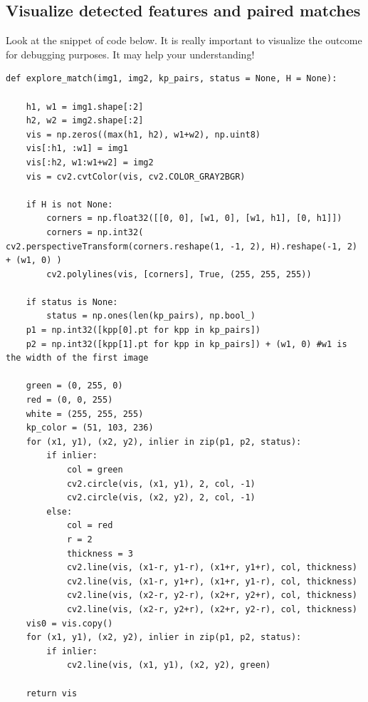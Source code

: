 \documentclass[aps,letterpaper,10pt]{revtex4}
\begin{document}
\subsection{Visualize detected features and paired matches}
Look at the snippet of code below. It is really important to visualize the outcome for debugging purposes. It may help your understanding!
\begin{lstlisting}
def explore_match(img1, img2, kp_pairs, status = None, H = None):

    h1, w1 = img1.shape[:2]
    h2, w2 = img2.shape[:2]
    vis = np.zeros((max(h1, h2), w1+w2), np.uint8)
    vis[:h1, :w1] = img1
    vis[:h2, w1:w1+w2] = img2
    vis = cv2.cvtColor(vis, cv2.COLOR_GRAY2BGR)

    if H is not None:
        corners = np.float32([[0, 0], [w1, 0], [w1, h1], [0, h1]])
        corners = np.int32( cv2.perspectiveTransform(corners.reshape(1, -1, 2), H).reshape(-1, 2) + (w1, 0) )
        cv2.polylines(vis, [corners], True, (255, 255, 255))      

    if status is None:
        status = np.ones(len(kp_pairs), np.bool_)
    p1 = np.int32([kpp[0].pt for kpp in kp_pairs])
    p2 = np.int32([kpp[1].pt for kpp in kp_pairs]) + (w1, 0) #w1 is the width of the first image

    green = (0, 255, 0)
    red = (0, 0, 255)
    white = (255, 255, 255)
    kp_color = (51, 103, 236)
    for (x1, y1), (x2, y2), inlier in zip(p1, p2, status):
        if inlier:
            col = green
            cv2.circle(vis, (x1, y1), 2, col, -1)
            cv2.circle(vis, (x2, y2), 2, col, -1)
        else:
            col = red
            r = 2
            thickness = 3
            cv2.line(vis, (x1-r, y1-r), (x1+r, y1+r), col, thickness)
            cv2.line(vis, (x1-r, y1+r), (x1+r, y1-r), col, thickness)
            cv2.line(vis, (x2-r, y2-r), (x2+r, y2+r), col, thickness)
            cv2.line(vis, (x2-r, y2+r), (x2+r, y2-r), col, thickness)
    vis0 = vis.copy()
    for (x1, y1), (x2, y2), inlier in zip(p1, p2, status):
        if inlier:
            cv2.line(vis, (x1, y1), (x2, y2), green)      

    return vis
\end{lstlisting}
\end{document}
